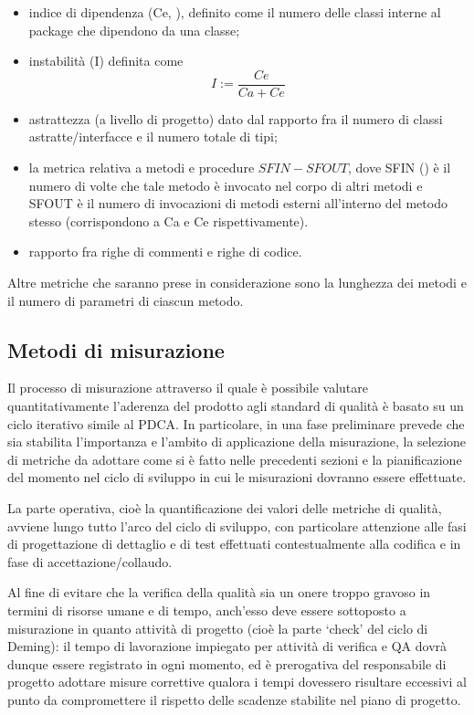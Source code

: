 \begin{itemize}
  \item indice di dipendenza (Ce, ), definito come il numero delle classi interne al package che dipendono da una classe;
  \item instabilità (I) definita come \[
  I := \frac{Ce}{Ca + Ce}
  \]
  \item astrattezza (a livello di progetto) dato dal rapporto fra il numero di classi astratte/interfacce e il numero totale di tipi;
  \item la metrica relativa a metodi e procedure $SFIN - SFOUT$, dove SFIN () è il numero di volte che tale metodo è invocato nel corpo di altri metodi e SFOUT è il numero di invocazioni di metodi esterni all'interno del metodo stesso (corrispondono a Ca e Ce rispettivamente).
  \item rapporto fra righe di commenti e righe di codice.
\end{itemize}

Altre metriche che saranno prese in considerazione sono la lunghezza dei metodi e il numero di parametri di ciascun metodo.

\subsection{Metodi di misurazione}
Il processo di misurazione attraverso il quale è possibile valutare quantitativamente l'aderenza del prodotto agli standard di qualità è basato su un ciclo iterativo simile al PDCA\@. In particolare, in una fase preliminare prevede che sia stabilita l'importanza e l'ambito di applicazione della misurazione, la selezione di metriche da adottare come si è fatto nelle precedenti sezioni e la pianificazione del momento nel ciclo di sviluppo in cui le misurazioni dovranno essere effettuate.

La parte operativa, cioè la quantificazione dei valori delle metriche di qualità, avviene lungo tutto l'arco del ciclo di sviluppo, con particolare attenzione alle fasi di progettazione di dettaglio e di test effettuati contestualmente alla codifica e in fase di accettazione/collaudo.

Al fine di evitare che la verifica della qualità sia un onere troppo gravoso in termini di risorse umane e di tempo, anch'esso deve essere sottoposto a misurazione in quanto attività di progetto (cioè la parte `check' del ciclo di Deming): il tempo di lavorazione impiegato per attività di verifica e QA dovrà dunque essere registrato in ogni momento, ed è prerogativa del responsabile di progetto adottare misure correttive qualora i tempi dovessero risultare eccessivi al punto da compromettere il rispetto delle scadenze stabilite nel piano di progetto.


